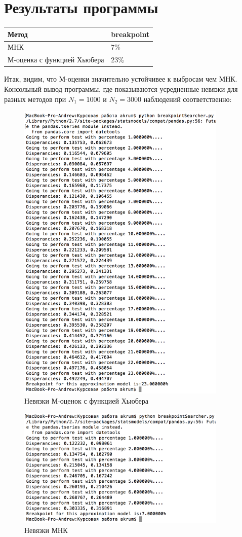 \documentclass[12pt]{article}
\begin{document}
\section{Результаты программы}
\begin{center}
\begin{tabular}{|p{8cm}|p{3cm}|}
    \hline
    Метод&breakpoint\\
    \hline
    МНК & 7\%\\
    М-оценка с функцией Хьюбера& 23\%\\
    \hline
\end{tabular}
\end{center}
Итак, видим, что М-оценки  значительно устойчивее к выбросам чем МНК.\hfill\break 
\newpage
Консольный вывод программы, где показываются усредненные невязки для разных методов при $N_1=1000$ и $N_2=3000$ наблюдений соответственно:
\begin{figure}[ht!]
    \centering
    \includegraphics[width=100mm]{RLMDisperancies.png}
    \caption{Невязки М-оценок с функцией Хьюбера\label{overflow}}
\end{figure}
\begin{figure}[ht!]
    \centering
    \includegraphics[width=100mm]{OLSDisperancies.png}
    \caption{Невязки МНК\label{overflow}}
\end{figure}
\newpage
\end{document}
